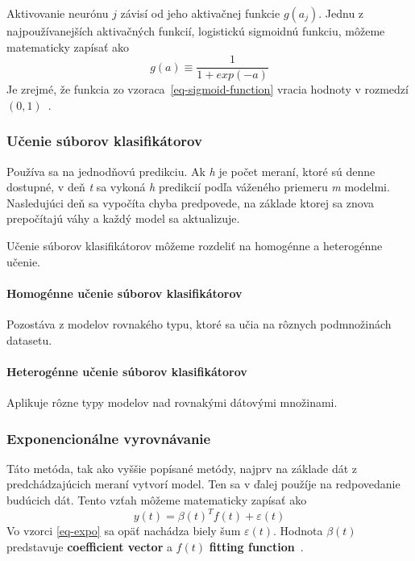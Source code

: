 \documentclass[a4paper,slovak,12pt,appendix]{article}
\begin{document}
Aktivovanie neurónu $j$ závisí od jeho aktivačnej funkcie $g(a_j)$. Jednu
z najpoužívanejších aktivačných funkcií, logistickú sigmoidnú funkciu, môžeme
matematicky zapísať ako
\begin{equation}
  g(a) \equiv \frac{1}{1 + exp(-a)}
  \label{eq-sigmoid-function}
\end{equation}
Je zrejmé, že funkcia zo vzoraca~\ref{eq-sigmoid-function} vracia hodnoty
v rozmedzí $(0,1)$~\cite{Merz1998}.


\subsubsection{Učenie súborov klasifikátorov}
Používa sa na jednodňovú predikciu. Ak \textit{h} je počet meraní, ktoré sú
denne dostupné, v deň \textit{t} sa vykoná \textit{h} predikcií podľa váženého
priemeru \textit{m} modelmi. Nasledujúci deň sa vypočíta chyba predpovede,
na základe ktorej sa znova prepočítajú váhy a každý model sa
aktualizuje\cite{Grmanova2016}.

Učenie súborov klasifikátorov môžeme rozdeliť na homogénne a heterogénne učenie.

\paragraph{Homogénne učenie súborov klasifikátorov}
Pozostáva z modelov rovnakého typu, ktoré sa učia na rôznych podmnožinách
datasetu.
\paragraph{Heterogénne učenie súborov klasifikátorov}
Aplikuje rôzne typy modelov nad rovnakými dátovými množinami\cite{Grmanova2016}.


\subsubsection{Exponencionálne vyrovnávanie}

Táto metóda, tak ako vyššie popísané metódy, najprv na základe dát
z predchádzajúcich meraní vytvorí model. Ten sa v ďalej použíje na
redpovedanie budúcich dát. Tento vzťah môžeme matematicky zapísať ako
\begin{equation}
  y(t) = \beta(t)^T f(t) + \varepsilon(t)
  \label{eq-expo}
\end{equation}
Vo vzorci \ref{eq-expo} sa opäť nachádza biely šum $\varepsilon(t)$. Hodnota
$\beta(t)$ predstavuje \textbf{coefficient vector} a $f(t)$
\textbf{fitting function}~\cite{Mahalakshmi2016}.
\end{document}
